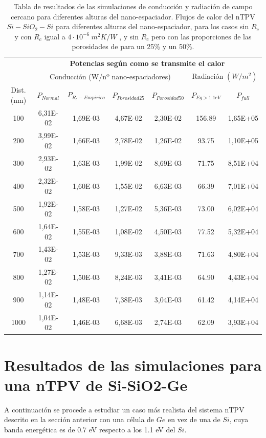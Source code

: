 \begin{table}[H]
	\centering
		\begin{tabular}{|c||c|c|c|c||c|c|}
		\hline
			\multirow{2}{*}{ }& \multicolumn{6}{c|}{\textbf{\large Potencias según como se transmite el calor}}\\ \cline{2-7}
		  & \multicolumn{4}{c||}{Conducción (W/nº nano-espaciadores)}& \multicolumn{2}{c|}{Radiación $(W/m^2)$}\\ \hline
			Dist. (nm)&$P_{Normal}$&$P_{R_c-Empirico}$&$P_{Porosidad25}$&$P_{Porosidad50}$&$P_{Eg>1.1eV}$&$P_{full}$\\ \hline \hline
			100&6,31E-02&1,69E-03&4,67E-02&2,30E-02&156.89&1,65E+05\\ \hline
			200&3,99E-02&1,66E-03&2,78E-02&1,26E-02&93.75&1,10E+05\\ \hline
			300&2,93E-02&1,63E-03&1,99E-02&8,69E-03&71.75&8,51E+04\\ \hline
			400&2,32E-02&1,60E-03&1,55E-02&6,63E-03&66.39&7,01E+04\\ \hline
			500&1,92E-02&1,58E-03&1,27E-02&5,36E-03&73.00&6,02E+04\\ \hline
			600&1,64E-02&1,55E-03&1,08E-02&4,50E-03&77.52&5,32E+04\\ \hline
			700&1,43E-02&1,53E-03&9,33E-03&3,88E-03&71.63&4,80E+04\\ \hline
			800&1,27E-02&1,50E-03&8,24E-03&3,41E-03&64.90&4,43E+04\\ \hline
			900&1,14E-02&1,48E-03&7,38E-03&3,04E-03&61.42&4,14E+04\\ \hline
		 1000&1,04E-02&1,46E-03&6,68E-03&2,74E-03&62.09&3,93E+04\\ \hline
		\end{tabular}
	\caption{Tabla de resultados de las simulaciones de conducción y radiación de campo cercano para diferentes alturas del nano-espaciador. Flujos de calor del nTPV $Si-SiO_2-Si$ para diferentes alturas del nano-espaciador, para los casos sin $R_c$ y con $R_c$ igual a $4 \cdot 10^{-6} \ m^2 K/W$ \cite{nf_TPV_Pillars_SiO2}, y sin $R_c$ pero con las proporciones de las porosidades de \cite{ThermalConductivity_SiO2_2018} para un 25\% y un 50\%.}
	\label{tab:condTerSiSiO2Si}
\end{table}
\vfill \newpage
\section{Resultados de las simulaciones para una nTPV de Si-SiO2-Ge}
A continuación se procede a estudiar un caso más realista del sistema nTPV descrito en la sección anterior con una célula de $Ge$ en vez de una de $Si$, cuya banda energética es de 0.7 eV respecto a los 1.1 eV del $Si$.
